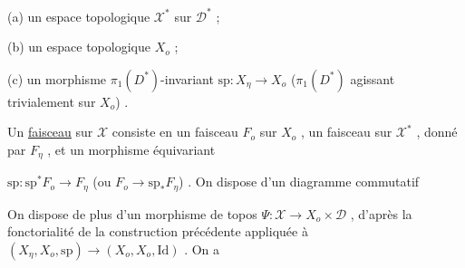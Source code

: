 (a) un espace topologique $\mathcal{X}^*$ sur $\mathcal{D}^*$ ;

(b) un espace topologique $X_o$ ;

(c) un morphisme $\pi_1(D^*)$-invariant $\mathrm{sp} : X_\eta \to X_o$ ($\pi_1(D^*)$ agissant trivialement sur $X_o$) .

Un \underline{faisceau} sur $\mathcal{X}$ consiste en un faisceau $F_o$ sur $X_o$ , un faisceau sur $\mathcal{X}^*$ , donné par $F_\eta$ , et un morphisme équivariant

$\mathrm{sp} : \mathrm{sp}^* F_o \longrightarrow F_\eta$ (ou $F_o \longrightarrow \mathrm{sp}_* F_\eta$) . On dispose d'un diagramme commutatif 



\begin{center}
\end{center}
On dispose de plus d'un morphisme de topos $\Psi : \mathcal{X} \to X_o \times \mathcal{D}$ , d'après la fonctorialité de la construction précédente appliquée à $(X_\eta , X_o, \mathrm{sp}) \longrightarrow (X_o, X_o, \mathrm{Id})$ . On a

